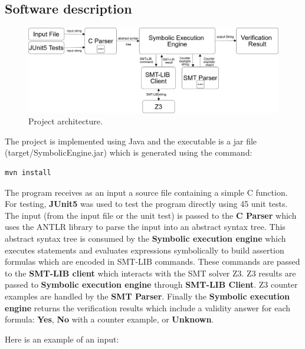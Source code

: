\documentclass[12pt,a4paper]{article}
\begin{document}
\subsection{Software description} \label{sec:software}


\begin{figure}[h]
 \centering
 \includegraphics[scale=.25,keepaspectratio=true]{./engine.png}
 \caption{Project architecture.}
 \label{fig:engine}
\end{figure}

The project is implemented using Java and the executable is a jar file (target/SymbolicEngine.jar) which is generated using the command:

\begin{lstlisting}  
mvn install
\end{lstlisting}  

The program receives as an input a source file containing a simple C function. For testing, \textbf{JUnit5} was used to test the program directly using 45 unit tests. The input (from the input file or the unit test) is passed to the \textbf{C Parser} which uses the ANTLR library to parse the input into an abstract syntax tree. This abstract syntax tree is consumed by the \textbf{Symbolic execution engine} which executes statements and evaluates expressions symbolically to build assertion formulas which are encoded in SMT-LIB commands. These commands are passed to the \textbf{SMT-LIB client} which interacts with the SMT solver Z3.  
Z3 results are passed to \textbf{Symbolic execution engine} through \textbf{SMT-LIB Client}. Z3 counter examples are handled by the \textbf{SMT Parser}. Finally the \textbf{Symbolic execution engine} returns the verification results which include a validity answer for each formula: \textbf{Yes}, \textbf{No} with a counter example, or \textbf{Unknown}. 


Here is an example of an input:
\end{document}
